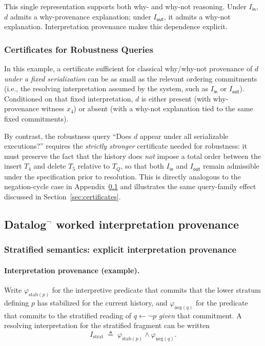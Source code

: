 \documentclass[acmsmall,nonacm]{acmart}
\theoremstyle{remark}
\numberwithin{definition}{section}
\numberwithin{theorem}{section}
\numberwithin{lemma}{section}
\numberwithin{corollary}{section}
\numberwithin{remark}{section}
\numberwithin{example}{section}
\numberwithin{observation}{section}
\numberwithin{assumption}{section}
\begin{document}
This single representation supports both why- and why-not reasoning.
Under $I_{\mathsf{in}}$, $d$ admits a why-provenance explanation; under
$I_{\mathsf{out}}$, it admits a why-not explanation.
Interpretation provenance makes this dependence explicit.

\subsubsection{Certificates for Robustness Queries}

In this example, a certificate sufficient for classical why/why-not provenance of $d$ \emph{under a fixed serialization} can be as small as the relevant ordering commitments (i.e., the resolving interpretation assumed by the system, such as $I_{\mathsf{in}}$ or $I_{\mathsf{out}}$). Conditioned on that fixed interpretation, $d$ is either present (with why-provenance witness $x_4$) or absent (with a why-not explanation tied to the same fixed commitments).

By contrast, the robustness query “Does $d$ appear under all serializable executions?” requires the
\emph{strictly stronger} certificate needed for robustness: it must preserve the fact that the history does
\emph{not} impose a total order between the insert $T_4$ and delete $T_5$ relative to $T_Q$, so that both
$I_{\mathsf{in}}$ and $I_{\mathsf{out}}$ remain admissible under the specification prior to resolution. This
is directly analogous to the negation-cycle case in Appendix~\ref{sec:appendix-datalog} and illustrates the same
query-family effect discussed in Section~\ref{sec:certificates}.

\subsection{Datalog\texorpdfstring{$^{\neg}$}{ with negation} worked interpretation provenance}
\label{sec:appendix-datalog}

\subsubsection{Stratified semantics: explicit interpretation provenance}

\paragraph{Interpretation provenance (example).}
Write $\varphi_{\mathrm{stab}(p)}$ for the interpretive predicate that commits
that the lower stratum defining $p$ has stabilized for the current history, and
$\varphi_{\mathrm{neg}(q)}$ for the predicate that commits to the stratified
reading of $q \leftarrow \neg p$ \emph{given} that commitment.
A resolving interpretation for the stratified fragment can be written
\[
  I_{\mathrm{strat}} \;\triangleq\;
  \varphi_{\mathrm{stab}(p)} \wedge \varphi_{\mathrm{neg}(q)}.
\]
\end{document}
